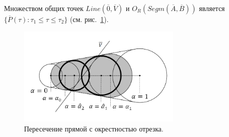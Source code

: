 Множеством общих точек $Line(\overline{0}, \overline{V})$ и $O_R(Segm(\overline{A}, \overline{B}))$ является $\{ \overline{P}(\tau): \tau_1 \le \tau \le \tau_2 \}$ (см. рис.~\ref{fig:text_1_geo_prim_spheres_nest_intersection}).

\begin{figure}[ht]
	\centering
	\includegraphics[width=0.7\textwidth]{./pics/text_1_geo_prim/spheres_nest_intersection.pdf}
	\caption{Пересечение прямой с окрестностью отрезка.}
	\label{fig:text_1_geo_prim_spheres_nest_intersection}
\end{figure}

